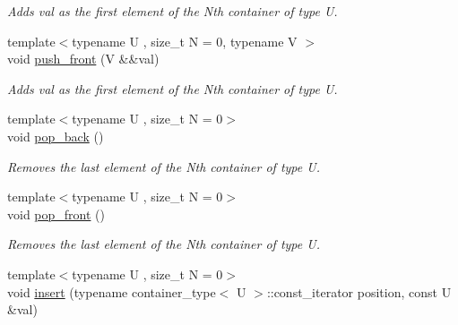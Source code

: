 \begin{DoxyCompactItemize}
\begin{DoxyCompactList}\small\item\em Adds val as the first element of the Nth container of type U. \end{DoxyCompactList}\item 
\hypertarget{classheterogeneous_1_1heterodeque_3_01_t_00_01_types_8_8_8_4_a9ead0fc2f577a56fe742a7421cf2cfb4}{}{\footnotesize template$<$typename U , size\+\_\+t N = 0, typename V $>$ }\\void \hyperlink{classheterogeneous_1_1heterodeque_3_01_t_00_01_types_8_8_8_4_a9ead0fc2f577a56fe742a7421cf2cfb4}{push\+\_\+front} (V \&\&val)\label{classheterogeneous_1_1heterodeque_3_01_t_00_01_types_8_8_8_4_a9ead0fc2f577a56fe742a7421cf2cfb4}

\begin{DoxyCompactList}\small\item\em Adds val as the first element of the Nth container of type U. \end{DoxyCompactList}\item 
\hypertarget{classheterogeneous_1_1heterodeque_3_01_t_00_01_types_8_8_8_4_af18d0dd1fddc47727e81231bf702efc6}{}{\footnotesize template$<$typename U , size\+\_\+t N = 0$>$ }\\void \hyperlink{classheterogeneous_1_1heterodeque_3_01_t_00_01_types_8_8_8_4_af18d0dd1fddc47727e81231bf702efc6}{pop\+\_\+back} ()\label{classheterogeneous_1_1heterodeque_3_01_t_00_01_types_8_8_8_4_af18d0dd1fddc47727e81231bf702efc6}

\begin{DoxyCompactList}\small\item\em Removes the last element of the Nth container of type U. \end{DoxyCompactList}\item 
\hypertarget{classheterogeneous_1_1heterodeque_3_01_t_00_01_types_8_8_8_4_a33133b5df06bd8833738a6cdb73e9210}{}{\footnotesize template$<$typename U , size\+\_\+t N = 0$>$ }\\void \hyperlink{classheterogeneous_1_1heterodeque_3_01_t_00_01_types_8_8_8_4_a33133b5df06bd8833738a6cdb73e9210}{pop\+\_\+front} ()\label{classheterogeneous_1_1heterodeque_3_01_t_00_01_types_8_8_8_4_a33133b5df06bd8833738a6cdb73e9210}

\begin{DoxyCompactList}\small\item\em Removes the last element of the Nth container of type U. \end{DoxyCompactList}\item 
\hypertarget{classheterogeneous_1_1heterodeque_3_01_t_00_01_types_8_8_8_4_a55114e919ca645d0a7a1fb9ea31471c1}{}{\footnotesize template$<$typename U , size\+\_\+t N = 0$>$ }\\void \hyperlink{classheterogeneous_1_1heterodeque_3_01_t_00_01_types_8_8_8_4_a55114e919ca645d0a7a1fb9ea31471c1}{insert} (typename container\+\_\+type$<$ U $>$\+::const\+\_\+iterator position, const U \&val)\label{classheterogeneous_1_1heterodeque_3_01_t_00_01_types_8_8_8_4_a55114e919ca645d0a7a1fb9ea31471c1}


\end{DoxyCompactItemize}

